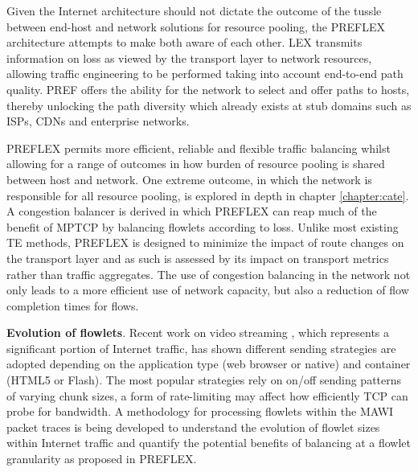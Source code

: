 Given the Internet architecture should not dictate the outcome of the tussle between end-host and network solutions for resource pooling, the \ac{PREFLEX} architecture attempts to make both aware of each other.
\acf{LEX} transmits information on loss as viewed by the transport layer to network resources, allowing traffic engineering to be performed taking into account end-to-end path quality.
\acf{PREF} offers the ability for the network to select and offer paths to hosts, thereby unlocking the path diversity which already exists at stub domains such as \acp{ISP}, \acp{CDN} and enterprise networks.

\ac{PREFLEX} permits more efficient, reliable and flexible traffic balancing whilst allowing for a range of outcomes in how burden of resource pooling is shared between host and network.
One extreme outcome, in which the network is responsible for all resource pooling, is explored in depth in chapter \ref{chapter:cate}.
A congestion balancer is derived in which \ac{PREFLEX} can reap much of the benefit of \ac{MPTCP} by balancing flowlets according to loss.
Unlike most existing \ac{TE} methods, \ac{PREFLEX} is designed to minimize the impact of route changes on the transport layer and as such is assessed by its impact on transport metrics rather than traffic aggregates.
The use of congestion balancing in the network not only leads to a more efficient use of network capacity, but also a reduction of flow completion times for flows.

    \textbf{Evolution of flowlets}. Recent work on video streaming \cite{Rao:2011p547} , which represents a significant portion of Internet traffic, 
    has shown different sending strategies are adopted depending on the application type (web browser or native) and container (HTML5 or Flash).
    The most popular strategies rely on on/off sending patterns of varying chunk sizes, a form of rate-limiting may affect how efficiently \ac{TCP} can probe for bandwidth.
    A methodology for processing flowlets within the \ac{MAWI} packet traces is being developed to understand the evolution of flowlet sizes within Internet traffic and quantify the potential benefits of balancing at a flowlet granularity as proposed in \ac{PREFLEX}.

